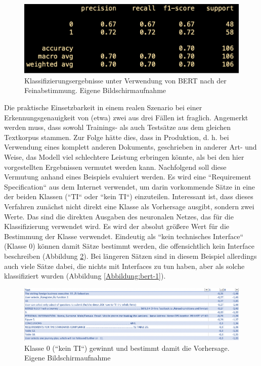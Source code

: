 \begin{figure}[h]
\centering
\includegraphics[scale=0.95]{content/pics/Picture_23.png}
\caption{Klassifizierungsergebnisse unter Verwendung von BERT nach der Feinabstimmung. Eigene Bildschirmaufnahme}
\label{Abbildung:bert-confusion}
\end{figure}

Die praktische Einsetzbarkeit in einem realen Szenario bei einer Erkennungsgenauigkeit von (etwa) zwei aus drei Fällen ist fraglich. Angemerkt werden muss, dass sowohl Trainings- als auch Testsätze aus dem gleichen Textkorpus stammen. Zur Folge hätte dies, dass in Produktion, d. h. bei Verwendung eines komplett anderen Dokuments, geschrieben in anderer Art- und Weise, das Modell viel schlechtere Leistung erbringen könnte, als bei den hier vorgestellten Ergebnissen vermutet werden kann. Nachfolgend soll diese Vermutung anhand eines Beispiels evaluiert werden. Es wird eine ``Requirement Specification`` aus dem Internet verwendet, um darin vorkommende Sätze in eine der beiden Klassen (``TI`` oder ``kein TI``) einzuteilen. Interessant ist, dass dieses Verfahren zunächst nicht direkt eine Klasse als Vorhersage ausgibt, sondern zwei Werte. Das sind die direkten Ausgaben des neuronalen Netzes, das für die Klassifizierung verwendet wird. Es wird der absolut größere Wert für die Bestimmung der Klasse verwendet. Eindeutig als ``kein technisches Interface`` (Klasse 0) können damit Sätze bestimmt werden, die offensichtlich kein Interface beschreiben (Abbildung \ref{Abbildung:bert-0}). Bei längeren Sätzen sind in diesem Beispiel allerdings auch viele Sätze dabei, die nichts mit Interfaces zu tun haben, aber als solche klassifiziert wurden (Abbildung \ref{Abbildung:bert-1}).

\begin{figure}[h]
\centering
\includegraphics[scale=0.95]{content/pics/Picture_25.png}
\caption{Klasse 0 (``kein TI``) gewinnt und bestimmt damit die Vorhersage. Eigene Bildschirmaufnahme}
\label{Abbildung:bert-0}
\end{figure}

